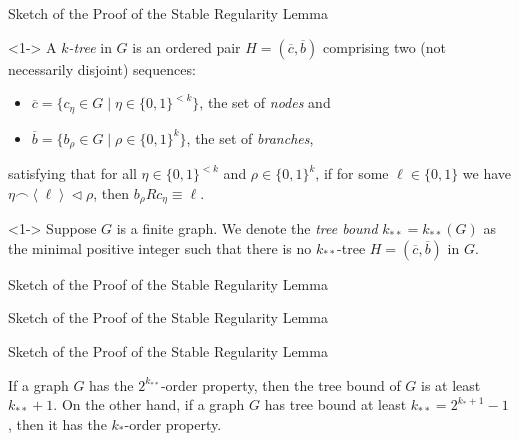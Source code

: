 \documentclass{beamer}
\newcommand{\parcurly}[1]{\{ #1 \}}
\newcommand{\Partriangle}[1]{\left< #1 \right>}
\begin{document}
\begin{frame}{Sketch of the Proof of the Stable Regularity Lemma}
    \begin{definition}[$k$-tree]<1-> \label{def:k-tree}
        A \emph{$k$-tree} in $G$ is an ordered pair $H = (\overline{c},\overline{b})$ comprising two (not necessarily
        disjoint) sequences:
        \begin{itemize}
            \item $\overline{c} = \parcurly{ c_\eta \in G \mid \eta \in \parcurly{0,1}^{<k} }$, the set of \emph{nodes} and
            \item $\overline{b} = \parcurly{ b_\rho \in G \mid \rho \in \parcurly{0,1}^k }$, the set of \emph{branches},
        \end{itemize}
        satisfying that for all $\eta \in \parcurly{0,1}^{<k}$ and $\rho \in \parcurly{0,1}^k$,
        if for some $\ell \in \parcurly{0, 1}$ we have $\eta \frown \Partriangle{\ell} \triangleleft \rho$, then
        $b_\rho R c_\eta \equiv \ell$.
    \end{definition}

    \begin{definition}<1-> \label{def:tree_bound}
        Suppose $G$ is a finite graph.
        We denote the \emph{tree bound} $k_{**} = k_{**}(G)$ as the minimal positive integer such that there is no
        $k_{**}$-tree $H = (\overline{c},\overline{b})$ in $G$.
    \end{definition}
\end{frame}

\begin{frame}{Sketch of the Proof of the Stable Regularity Lemma}
    
\end{frame}

\begin{frame}{Sketch of the Proof of the Stable Regularity Lemma}
    
\end{frame}

\begin{frame}{Sketch of the Proof of the Stable Regularity Lemma}
    \begin{theorem} \label{thm:tree_implies_order}
         {
            If a graph $G$ has the $2^{k_{**}}$-order property, then the tree bound of $G$ is at least $k_{**} + 1$.
            On the other hand, if a graph $G$ has tree bound at least $k_{**} = 2^{k_*+1}-1$, then it has the $k_*$-order
            property.
        }
    \end{theorem}
\end{frame}
\end{document}
